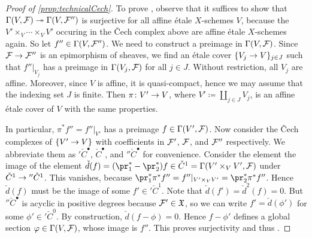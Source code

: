 \begin{proof}[Proof of \cref{prop:technicalCech}]
	To prove \itememph{*}, observe that it suffices to show that $\Global(V,\Ff)\epimorphism \Global(V,\Ff'')$ is surjective for all affine étale $X$-schemes $V$, because the $V'\times_V\dotsb\times_VV'$ occuring in the \v Cech complex above are affine étale $X$-schemes again. So let $f''\in \operatorname{\Gamma}(V,\mathcal{F}'')$. We need to construct a preimage in $\operatorname{\Gamma}(V,\mathcal{F})$. Since $\Ff\morphism\Ff''$ is an epimorphism of sheaves, we find an étale cover $\{V_j\morphism V\}_{j\in J}$ such that $f''|_{V_j}$ has a preimage in $\operatorname{\Gamma}(V_j,\mathcal{F})$ for all $j\in J$. Without restriction, all $V_j$ are affine. Moreover, since $V$ is affine, it is quasi-compact, hence we may assume that the indexing set $J$ is finite. Then $\pi\colon V'\morphism V$, where $V'\coloneqq\coprod_{j\in J}V_j$, is an affine étale cover of $V$ with the same properties.
	
	In particular, $\pi^*f''=f''|_{V'}$ has a preimage $f\in \operatorname{\Gamma}(V',\mathcal{F})$. Now consider the \v Cech complexes of $\{V'\morphism V\}$ with coefficients in $\mathcal{F}'$, $\mathcal{F}$, and $\mathcal{F}''$ respectively. We abbreviate them as $'\check{C}^\bullet$, $\check{C}^\bullet$, and $''\check{C}^\bullet$ for convenience. Consider the element the image of the element $\check{d}(f)=(\pr_1^*-\pr_2^*)f\in \check{C}^1=\Global(V'\times_VV',\Ff)$ under $\check{C}^1\morphism {''\check{C}^1}$. This vanishes, because $\pr_1^*\pi^*f''=f''|_{V'\times_VV'}=\pr_2^*\pi^*f''$. Hence $\check{d}(f)$ must be the image of some $f'\in {'\check{C}^1}$. Note that $\check{d}(f')=\check{d}^2(f)=0$. But $''\check{C}^\bullet$ is acyclic in positive degrees because $\mathcal{F}'\in \mathfrak{X}$, so we can write $f'=\check{d}(\phi')$ for some $\phi'\in {'\check{C}^0}$. By construction, $\check{d}(f-\phi)=0$. Hence $f-\phi'$ defines a global section $\varphi\in \operatorname{\Gamma}(V,\mathcal{F})$, whose image is $f''$. This proves surjectivity and thus \itememph{*}.
	

\end{proof}
